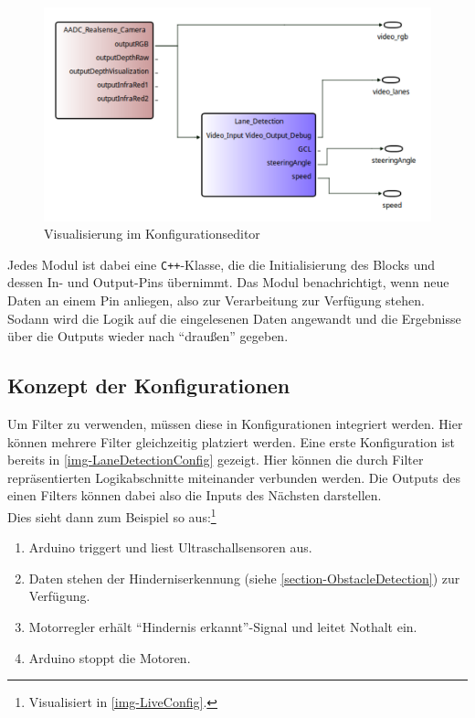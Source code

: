 \documentclass[a4paper,12pt]{report}
\begin{document}
	\begin{figure}[ht]
		\centering
		\includegraphics[width=\textwidth, height=\textheight, keepaspectratio]{assets/LaneDetectionConfig}
		\caption{Visualisierung im Konfigurationseditor}
		\label{img-LaneDetectionConfig}
	\end{figure}

	Jedes Modul ist dabei eine \texttt{C++}-Klasse, die die Initialisierung des Blocks und dessen In- und Output-Pins übernimmt.
	Das Modul benachrichtigt, wenn neue Daten an einem Pin anliegen, also zur Verarbeitung zur Verfügung stehen.
	Sodann wird die Logik auf die eingelesenen Daten angewandt und die Ergebnisse über die Outputs wieder nach ``draußen'' gegeben.


\subsection{Konzept der Konfigurationen}

	Um Filter zu verwenden, müssen diese in Konfigurationen integriert werden.
	Hier können mehrere Filter gleichzeitig platziert werden.
	Eine erste Konfiguration ist bereits in \autoref{img-LaneDetectionConfig} gezeigt.
	Hier können die durch Filter repräsentierten Logikabschnitte miteinander verbunden werden.
	Die Outputs des einen Filters können dabei also die Inputs des Nächsten darstellen.
	\\
	Dies sieht dann zum Beispiel so aus:\footnote{Visualisiert in \autoref{img-LiveConfig}.}
	\begin{enumerate}
		\item Arduino triggert und liest Ultraschallsensoren aus.
		\item Daten stehen der Hinderniserkennung (siehe \autoref{section-ObstacleDetection}) zur Verfügung.
		\item Motorregler erhält ``Hindernis erkannt''-Signal und leitet Nothalt ein.
		\item Arduino stoppt die Motoren.
	\end{enumerate}
\end{document}
